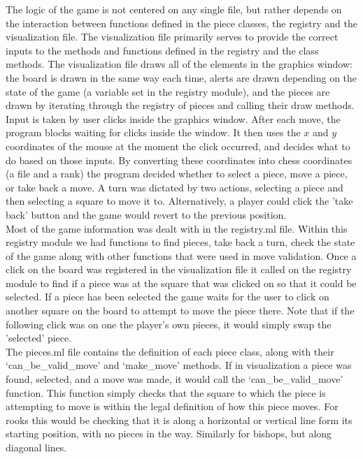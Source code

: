 \documentclass{article}
\begin{document}
The logic of the game is not centered on any single file, but rather depends on the interaction between functions defined in the piece classes, the registry and the visualization file. The visualization file primarily serves to provide the correct inputs to the methods and functions defined in the registry and the class methods. The visualization file draws all of the elements in the graphics window: the board is drawn in the same way each time, alerts are drawn depending on the state of the game (a variable set in the registry module), and the pieces are drawn by iterating through the registry of pieces and calling their draw methods. Input is taken by user clicks inside the graphics window. After each move, the program blocks waiting for clicks inside the window. It then uses the $x$ and $y$ coordinates of the mouse at the moment the click occurred, and decides what to do based on those inputs. By converting these coordinates into chess coordinates (a file and a rank) the program decided whether to select a piece, move a piece, or take back a move. A turn was dictated by two actions, selecting a piece and then selecting a square to move it to. Alternatively, a player could click the 'take back' button and the game would revert to the previous position. \\
Most of the game information was dealt with in the registry.ml file. Within this registry module we had functions to find pieces, take back a turn, check the state of the game along with other functions that were used in move validation. Once a click on the board was registered in the visualization file it called on the registry module to find if a piece was at the square that was clicked on so that it could be selected. If a piece has been selected the game waits for the user to click on another square on the board to attempt to move the piece there. Note that if the following click was on one the player's own pieces, it would simply swap the 'selected' piece. \\
The pieces.ml file contains the definition of each piece class, along with their `can\_be\_valid\_move'  and `make\_move' methods. If in visualization a piece was found, selected, and a move was made, it would call the `can\_be\_valid\_move' function. This function simply checks that the square to which the piece is attempting to move is within the legal definition of how this piece moves. For rooks this would be checking that it is along a horizontal or vertical line form its starting position, with no pieces in the way. Similarly for bishops, but along diagonal lines. \\
\end{document}
